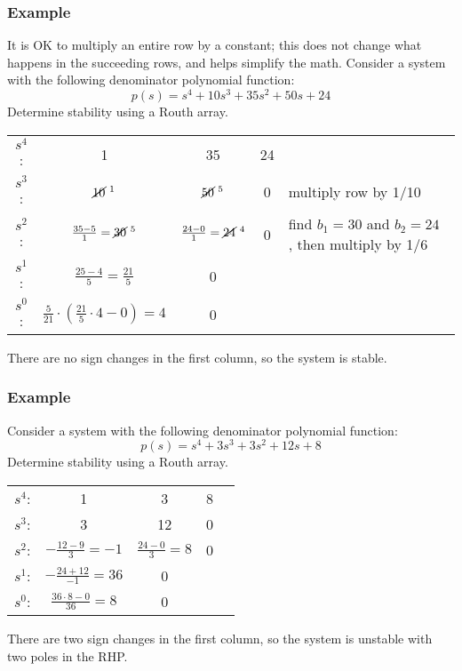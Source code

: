 \documentclass{book}
\newcommand{\exmp}{\subsubsection*{Example}}
\begin{document}
\exmp
It is OK to multiply an entire row by a constant; this does not change what happens in the succeeding rows, and helps simplify the math. Consider a system with the following denominator polynomial function:
\[ p(s) = s^4 + 10s^3 + 35s^2 + 50s + 24 \]
Determine stability using a Routh array.
\begin{center}
	\begin{tabular}{c c c c l}\vspace{1em}
		$ s^4 $: &  1 & 35 & 24 & \\ \vspace{1em}
		$ s^3 $: & $ \cancel{10}^{\ 1} $ & $ \cancel{50}^{\ 5} $ & 0 & multiply row by 1/10 \\ \vspace{1em}
		$ s^2 $: & $ \frac{35-5}{1}=\cancel{30}^{\ 5} $ & $ \frac{24-0}{1}=\cancel{24}^{\ 4}$ &0 & find $ b_1=30 $ and $ b_2=24 $ , then multiply by 1/6\\ \vspace{1em}
		$ s^1 $: & $ \frac{25-4}{5}=\frac{21}{5} $ &0 & & \\ \vspace{1em}
		$ s^0 $: & $ \frac{5}{21}\cdot\left(\frac{21}{5}\cdot4-0\right) = 4 $ &0 & &
	\end{tabular}
\end{center}
There are no sign changes in the first column, so the system is stable. 

\exmp
Consider a system with the following denominator polynomial function:
\[ p(s) = s^4 + 3s^3 + 3s^2 + 12s + 8 \]
Determine stability using a Routh array.
\begin{center}
	\begin{tabular}{c c c c l}\vspace{1em}
		$ s^4 $: &  1 & 3 & 8 & \\ \vspace{1em}
		$ s^3 $: & 3 & 12 & 0 & \\ \vspace{1em}
		$ s^2 $: & $ -\frac{12-9}{3}=-1 $ & $ \frac{24-0}{3}=8$ & 0 & \\ \vspace{1em}
		$ s^1 $: & $ -\frac{24+12}{-1}=36 $ & 0& & \\ \vspace{1em}
		$ s^0 $: & $ \frac{36\cdot 8 - 0}{36} = 8 $ &0 & &
	\end{tabular}
\end{center}
There are two sign changes in the first column, so the system is unstable with two poles in the RHP. 
\end{document}
